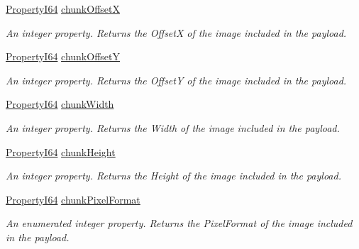 \begin{DoxyCompactItemize}
\hyperlink{group___common_interface_ga81749b2696755513663492664a18a893}{Property\+I64} \hyperlink{classmv_i_m_p_a_c_t_1_1acquire_1_1_gen_i_cam_1_1_chunk_data_control_acc2f89fbe1e30303592aa20d17323814}{chunk\+Offset\+X}
\begin{DoxyCompactList}\small\item\em An integer property. Returns the Offset\+X of the image included in the payload. \end{DoxyCompactList}\item 
\hyperlink{group___common_interface_ga81749b2696755513663492664a18a893}{Property\+I64} \hyperlink{classmv_i_m_p_a_c_t_1_1acquire_1_1_gen_i_cam_1_1_chunk_data_control_a02440e61ff51103cfbc224a31cee7898}{chunk\+Offset\+Y}
\begin{DoxyCompactList}\small\item\em An integer property. Returns the Offset\+Y of the image included in the payload. \end{DoxyCompactList}\item 
\hyperlink{group___common_interface_ga81749b2696755513663492664a18a893}{Property\+I64} \hyperlink{classmv_i_m_p_a_c_t_1_1acquire_1_1_gen_i_cam_1_1_chunk_data_control_a6cf6b5feed11d6d46885ee126a7345f4}{chunk\+Width}
\begin{DoxyCompactList}\small\item\em An integer property. Returns the Width of the image included in the payload. \end{DoxyCompactList}\item 
\hyperlink{group___common_interface_ga81749b2696755513663492664a18a893}{Property\+I64} \hyperlink{classmv_i_m_p_a_c_t_1_1acquire_1_1_gen_i_cam_1_1_chunk_data_control_a333f4b2dfbc993bfbd6dbfc6049ca36e}{chunk\+Height}
\begin{DoxyCompactList}\small\item\em An integer property. Returns the Height of the image included in the payload. \end{DoxyCompactList}\item 
\hyperlink{group___common_interface_ga81749b2696755513663492664a18a893}{Property\+I64} \hyperlink{classmv_i_m_p_a_c_t_1_1acquire_1_1_gen_i_cam_1_1_chunk_data_control_a9ece8017c9040ec2ffc9b180bd3c1abb}{chunk\+Pixel\+Format}
\begin{DoxyCompactList}\small\item\em An enumerated integer property. Returns the Pixel\+Format of the image included in the payload. \end{DoxyCompactList}\item 

\end{DoxyCompactItemize}
